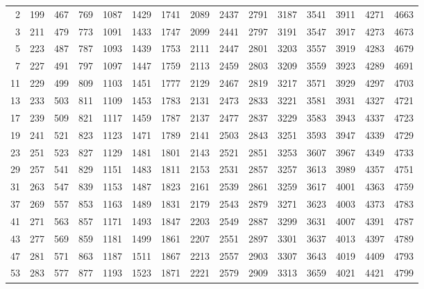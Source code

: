 \begingroup
\centering
\setlength{\tabcolsep}{1ex}
\begin{tabular}{rrrrrrrrrrrrrrr}
    2 &   199 &   467 &   769 &  1087 &  1429 &  1741 &  2089 &  2437 &  2791 &  3187 &  3541 &  3911 &  4271 &  4663 \\
    3 &   211 &   479 &   773 &  1091 &  1433 &  1747 &  2099 &  2441 &  2797 &  3191 &  3547 &  3917 &  4273 &  4673 \\
    5 &   223 &   487 &   787 &  1093 &  1439 &  1753 &  2111 &  2447 &  2801 &  3203 &  3557 &  3919 &  4283 &  4679 \\
    7 &   227 &   491 &   797 &  1097 &  1447 &  1759 &  2113 &  2459 &  2803 &  3209 &  3559 &  3923 &  4289 &  4691 \\
   11 &   229 &   499 &   809 &  1103 &  1451 &  1777 &  2129 &  2467 &  2819 &  3217 &  3571 &  3929 &  4297 &  4703 \\
   13 &   233 &   503 &   811 &  1109 &  1453 &  1783 &  2131 &  2473 &  2833 &  3221 &  3581 &  3931 &  4327 &  4721 \\
   17 &   239 &   509 &   821 &  1117 &  1459 &  1787 &  2137 &  2477 &  2837 &  3229 &  3583 &  3943 &  4337 &  4723 \\
   19 &   241 &   521 &   823 &  1123 &  1471 &  1789 &  2141 &  2503 &  2843 &  3251 &  3593 &  3947 &  4339 &  4729 \\
   23 &   251 &   523 &   827 &  1129 &  1481 &  1801 &  2143 &  2521 &  2851 &  3253 &  3607 &  3967 &  4349 &  4733 \\
   29 &   257 &   541 &   829 &  1151 &  1483 &  1811 &  2153 &  2531 &  2857 &  3257 &  3613 &  3989 &  4357 &  4751 \\
   31 &   263 &   547 &   839 &  1153 &  1487 &  1823 &  2161 &  2539 &  2861 &  3259 &  3617 &  4001 &  4363 &  4759 \\
   37 &   269 &   557 &   853 &  1163 &  1489 &  1831 &  2179 &  2543 &  2879 &  3271 &  3623 &  4003 &  4373 &  4783 \\
   41 &   271 &   563 &   857 &  1171 &  1493 &  1847 &  2203 &  2549 &  2887 &  3299 &  3631 &  4007 &  4391 &  4787 \\
   43 &   277 &   569 &   859 &  1181 &  1499 &  1861 &  2207 &  2551 &  2897 &  3301 &  3637 &  4013 &  4397 &  4789 \\
   47 &   281 &   571 &   863 &  1187 &  1511 &  1867 &  2213 &  2557 &  2903 &  3307 &  3643 &  4019 &  4409 &  4793 \\
   53 &   283 &   577 &   877 &  1193 &  1523 &  1871 &  2221 &  2579 &  2909 &  3313 &  3659 &  4021 &  4421 &  4799 \\

\end{tabular}
